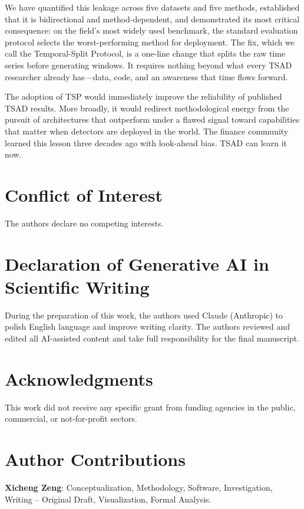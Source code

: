 \documentclass[preprint,12pt]{elsarticle}
\begin{document}
We have quantified this leakage across five datasets and five methods, established that it is bidirectional and method-dependent, and demonstrated its most critical consequence: on the field's most widely used benchmark, the standard evaluation protocol selects the worst-performing method for deployment. The fix, which we call the Temporal-Split Protocol, is a one-line change that splits the raw time series before generating windows. It requires nothing beyond what every TSAD researcher already has---data, code, and an awareness that time flows forward.

The adoption of TSP would immediately improve the reliability of published TSAD results. More broadly, it would redirect methodological energy from the pursuit of architectures that outperform under a flawed signal toward capabilities that matter when detectors are deployed in the world. The finance community learned this lesson three decades ago with look-ahead bias. TSAD can learn it now.


\section*{Conflict of Interest}
The authors declare no competing interests.

\section*{Declaration of Generative AI in Scientific Writing}
During the preparation of this work, the authors used Claude (Anthropic) to polish English language and improve writing clarity. The authors reviewed and edited all AI-assisted content and take full responsibility for the final manuscript.

\section*{Acknowledgments}
This work did not receive any specific grant from funding agencies in the public, commercial, or not-for-profit sectors.

\section*{Author Contributions}
\textbf{Xicheng Zeng}: Conceptualization, Methodology, Software, Investigation, Writing -- Original Draft, Visualization, Formal Analysis.
\end{document}
